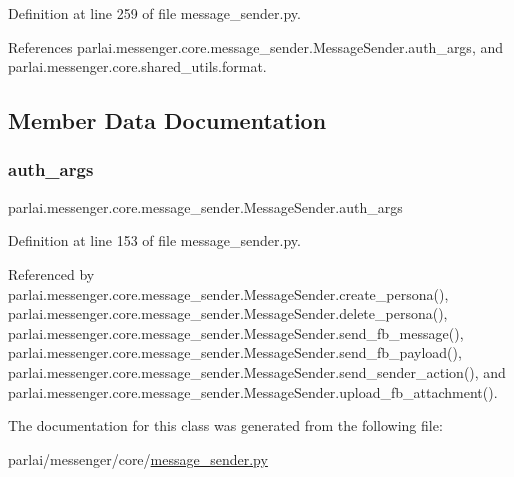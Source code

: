 Definition at line 259 of file message\+\_\+sender.\+py.



References parlai.\+messenger.\+core.\+message\+\_\+sender.\+Message\+Sender.\+auth\+\_\+args, and parlai.\+messenger.\+core.\+shared\+\_\+utils.\+format.



\subsection{Member Data Documentation}
\mbox{\label{classparlai_1_1messenger_1_1core_1_1message__sender_1_1MessageSender_a059a9d303e6db34e6a7bb1660b1a32d8}} 
\subsubsection{\texorpdfstring{auth\+\_\+args}{auth\_args}}
{\footnotesize\ttfamily parlai.\+messenger.\+core.\+message\+\_\+sender.\+Message\+Sender.\+auth\+\_\+args}



Definition at line 153 of file message\+\_\+sender.\+py.



Referenced by parlai.\+messenger.\+core.\+message\+\_\+sender.\+Message\+Sender.\+create\+\_\+persona(), parlai.\+messenger.\+core.\+message\+\_\+sender.\+Message\+Sender.\+delete\+\_\+persona(), parlai.\+messenger.\+core.\+message\+\_\+sender.\+Message\+Sender.\+send\+\_\+fb\+\_\+message(), parlai.\+messenger.\+core.\+message\+\_\+sender.\+Message\+Sender.\+send\+\_\+fb\+\_\+payload(), parlai.\+messenger.\+core.\+message\+\_\+sender.\+Message\+Sender.\+send\+\_\+sender\+\_\+action(), and parlai.\+messenger.\+core.\+message\+\_\+sender.\+Message\+Sender.\+upload\+\_\+fb\+\_\+attachment().



The documentation for this class was generated from the following file\+:\begin{DoxyCompactItemize}
\item 
parlai/messenger/core/\hyperlink{message__sender_8py}{message\+\_\+sender.\+py}\end{DoxyCompactItemize}
